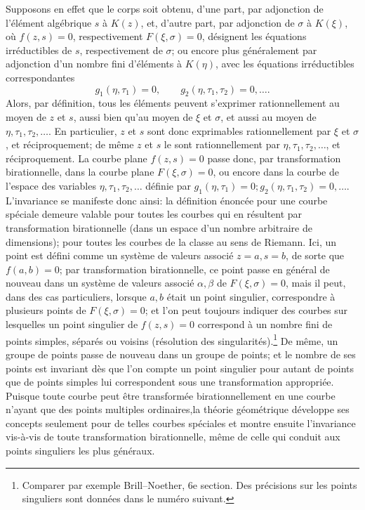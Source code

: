 Supposons en effet que le corps soit obtenu, d'une part, par adjonction de l'élément algébrique \(s\) à \(K(z)\), et, d'autre part, par adjonction de \(\sigma\) à \(K(\xi)\), où \(f(z,s)=0\), respectivement \(F(\xi,\sigma)=0\), désignent les équations irréductibles de \(s\), respectivement de \(\sigma\); ou encore plus généralement par adjonction d'un nombre fini d'éléments à \(K(\eta)\), avec les équations irréductibles correspondantes
\[
g_1(\eta,\tau_1)=0,\qquad g_2(\eta,\tau_1,\tau_2)=0,\ldots .
\]
Alors, par définition, tous les éléments peuvent s'exprimer rationnellement au moyen de \(z\) et \(s\), aussi bien qu'au moyen de \(\xi\) et \(\sigma\), et aussi au moyen de \(\eta,\tau_1,\tau_2,\ldots\). En particulier, \(z\) et \(s\) sont donc exprimables rationnellement par \(\xi\) et \(\sigma\), et réciproquement; de même \(z\) et \(s\) le sont rationnellement par \(\eta,\tau_1,\tau_2,\ldots\), et réciproquement. La courbe plane \(f(z,s)=0\) passe donc, par \og{}transformation birationnelle\fg{}, dans la courbe plane \(F(\xi,\sigma)=0\), ou encore dans la courbe de l'espace des variables \(\eta,\tau_1,\tau_2,\ldots\) définie par \(g_1(\eta,\tau_1)=0; g_2(\eta,\tau_1,\tau_2)=0,\ldots\). L'invariance se manifeste donc ainsi: la définition énoncée pour une courbe spéciale demeure valable pour toutes les courbes qui en résultent par transformation birationnelle (dans un espace d'un nombre arbitraire de dimensions); pour toutes les courbes de la \og{}classe\fg{} au sens de Riemann. Ici, un \og{}point\fg{} est défini comme un système de valeurs associé \(z=a,s=b\), de sorte que \(f(a,b)=0\); par transformation birationnelle, ce point passe en général de nouveau dans un système de valeurs associé \(\alpha,\beta\) de \(F(\xi,\sigma)=0\), mais il peut, dans des cas particuliers, lorsque \(a,b\) était un point \og{}singulier\fg{}, correspondre à plusieurs \og{}points\fg{} de \(F(\xi,\sigma)=0\); et l'on peut toujours indiquer des courbes sur lesquelles un point \og{}singulier\fg{} de \(f(z,s)=0\) correspond à un nombre fini de points simples, séparés ou voisins (résolution des singularités).\footnote{Comparer par exemple Brill--Noether, 6e section. Des précisions sur les points \og{}singuliers\fg{} sont données dans le numéro suivant.} De même, un groupe de points passe de nouveau dans un groupe de points; et le nombre de ses points est invariant dès que l'on compte un point singulier pour autant de points que de points simples lui correspondent sous une transformation appropriée. Puisque toute courbe peut être transformée birationnellement en une courbe n'ayant que des points \og{}multiples ordinaires\fg{},\footnotemark[\value{footnote}] la théorie géométrique développe ses concepts seulement pour de telles courbes spéciales et montre ensuite l'invariance vis-à-vis de toute transformation birationnelle, même de celle qui conduit aux points singuliers les plus généraux.

